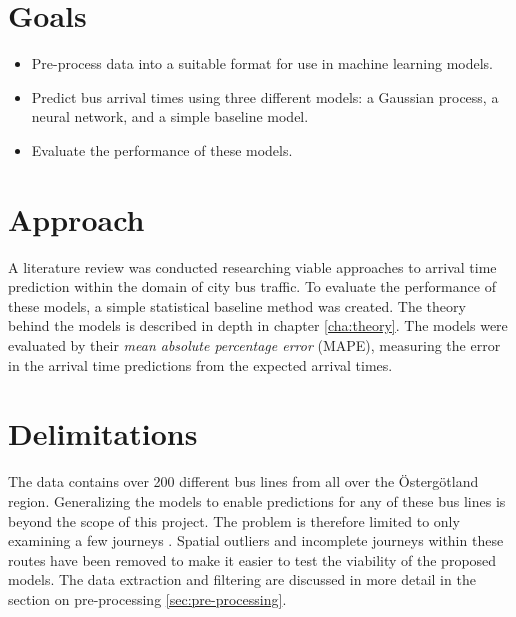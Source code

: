 \section{Goals}
\label{sec:aim}

\begin{itemize}[]
  \item Pre-process data into a suitable format for use in machine learning models.
  \item Predict bus arrival times using three different models: a Gaussian process, a neural network, and a simple baseline model.
  \item Evaluate the performance of these models.
\end{itemize}

\section{Approach}
\label{sec:research-questions}

A literature review was conducted researching viable approaches to arrival time prediction within the domain of city bus traffic. To evaluate the performance of these models, a simple statistical baseline method was created. The theory behind the models is described in depth in chapter \ref{cha:theory}. The models were evaluated by their \textit{mean absolute percentage error} (MAPE), measuring the error in the arrival time predictions from the expected arrival times.

\section{Delimitations}
\label{sec:delimitations}

The data contains over 200 different bus lines from all over the Östergötland region. Generalizing the models to enable predictions for any of these bus lines is beyond the scope of this project. The problem is therefore limited to only examining a few journeys . Spatial outliers and incomplete journeys within these routes have been removed to make it easier to test the viability of the proposed models. The data extraction and filtering are discussed in more detail in the section on pre-processing \ref{sec:pre-processing}.




